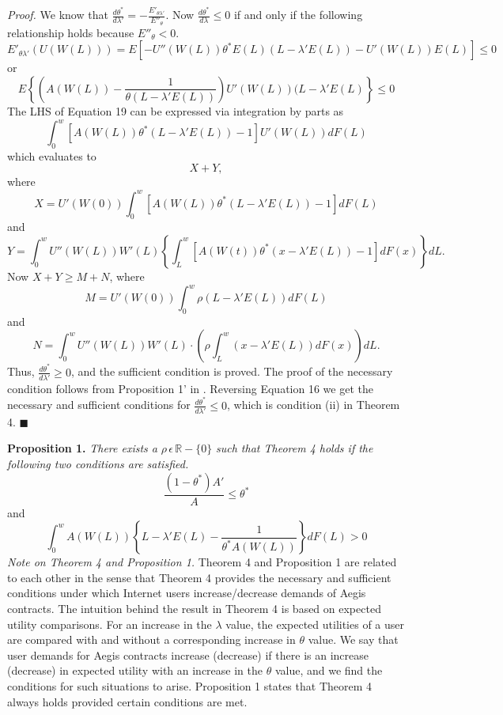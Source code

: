 \documentclass[letterpaper,12pt, onecolumn, nodraft]{IEEEtran}
\begin{document}
\emph{Proof.} We know that $\frac{d\theta^{*}}{d\lambda'} = -\frac{E'_{\theta\lambda'}}{E''_{\theta}}$. Now $\frac{d\theta^{*}}{d\lambda} \le 0$ if and only if the following relationship holds because $E''_{\theta} < 0$. 
\begin{equation}
E'_{\theta\lambda'}(U(W(L))) = E[-U''(W(L))\theta^{*}E(L)(L - \lambda'E(L)) - U'(W(L))E(L)] \le 0
\end{equation}
or 
\begin{equation}
E\left\{\left(A(W(L)) - \frac{1}{\theta(L - \lambda'E(L))}\right)U'(W(L))(L - \lambda'E(L)\right\} \le 0
\end{equation}
The LHS of Equation 19 can be expressed via integration by parts as 
\[\int_{0}^{w}[A(W(L))\theta^{*}(L - \lambda'E(L)) - 1]U'(W(L))dF(L)\]
which evaluates to 
\[X + Y,\]
where
\[X = U'(W(0))\int_{0}^{w}[A(W(L))\theta^{*}(L - \lambda'E(L)) - 1]dF(L)\]
and 
\[Y = \int_{0}^{w}U''(W(L))W'(L)\left\{\int_{L}^{w}[A(W(t))\theta^{*}(x - \lambda'E(L)) - 1]dF(x)\right\} dL.\]
Now $X + Y \ge M + N$, where
\[M = U'(W(0))\int_{0}^{w}\rho(L - \lambda'E(L))dF(L)\]
and
\[N = \int_{0}^{w}U''(W(L))W'(L)\cdot \left (\rho\int_{L}^{w}(x - \lambda'E(L))dF(x)\right) dL.\]
Thus, $\frac{d\theta^{*}}{d\lambda'} \ge 0$, and the sufficient condition is proved. The proof of the necessary condition follows from Proposition 1' in \cite{ah}. Reversing Equation 16 we get the necessary and sufficient conditions for $\frac{d\theta^{*}}{d\lambda'} \le 0$, which is condition (ii) in Theorem 4. $\blacksquare$

\textbf{Proposition 1.}  \emph{There exists a} $\rho\,\epsilon\,\mathbb{R} - \{0\}$ \emph{such that Theorem 4 holds if the following two conditions are satisfied.}
\begin{equation}
\frac{(1 - \theta^{*})A'}{A} \le \theta^{*}
\end{equation}
and 
\begin{equation}
\int_{0}^{w}A(W(L))\left\{L - \lambda' E(L) - \frac{1}{\theta^{*}A(W(L))}\right\}dF(L) > 0
\end{equation}
\emph{Note on Theorem 4 and Proposition 1.} Theorem 4 and Proposition 1 are related to each other in the sense that Theorem 4 provides the necessary and sufficient conditions under which Internet users increase/decrease demands of Aegis contracts. The intuition behind the result in Theorem 4 is based on expected utility comparisons. For an increase in the $\lambda$ value, the expected utilities of a user are compared with and without a corresponding increase in $\theta$ value. We say that user demands for Aegis contracts increase (decrease) if there is an increase (decrease) in expected utility with an increase in the $\theta$ value, and we find the conditions for such situations to arise. Proposition 1 states that Theorem 4 always holds provided certain conditions are met. 
 
\end{document}
